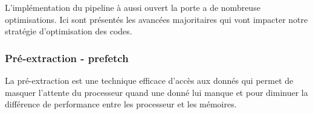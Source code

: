 L'implémentation du pipeline à aussi ouvert la porte a de nombreuse optimisations. Ici sont présentés les avancées majoritaires qui vont impacter notre stratégie d'optimisation des codes.

\subsubsection{Pré-extraction - prefetch}

\begin{fancyquotes}
La pré-extraction est une technique efficace d'accès aux donnés qui permet de masquer l'attente du processeur quand une donné lui manque et pour diminuer la différence de performance entre les processeur et les mémoires. \cite{Byna2009}
\end{fancyquotes}

